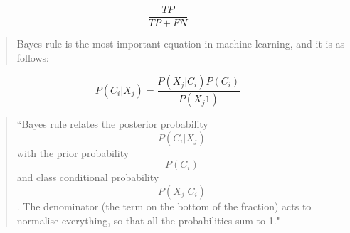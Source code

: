 \documentclass[12pt]{article}
\begin{document}
\begin{equation}
\frac{TP}{TP + FN}
\end{equation}

\begin{verse}
Bayes rule is the most important equation in machine learning, and it is as follows:
\end{verse}

\begin{equation}
P(C_i|X_j) = \frac{P(X_j|C_i)P(C_i)}{P(X_j1)}
\end{equation}

\begin{verse}
``Bayes rule relates the posterior probability $$P(C_i|X_j)$$ with the prior 
probability $$P(C_i)$$ and class conditional probability $$P(X_j|C_i)$$. The denominator (the term on the bottom of the fraction) acts to normalise everything, so that all the probabilities sum to 1."
\end{verse}
\end{document}
